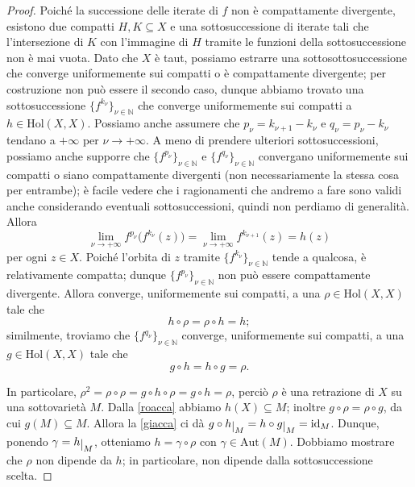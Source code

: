 \begin{proof}
    Poiché la successione delle iterate di $f$ non è compattamente divergente, esistono due compatti $H,K\subseteq X$ e una sottosuccessione di iterate tali che l'intersezione di $K$ con l'immagine di $H$ tramite le funzioni della sottosuccessione non è mai vuota. Dato che $X$ è taut, possiamo estrarre una sottosottosuccessione che converge uniformemente sui compatti o è compattamente divergente; per costruzione non può essere il secondo caso, dunque abbiamo trovato una sottosuccessione $\{f^{k_{\nu}}\}_{\nu\in\mathbb{N}}$ che converge uniformemente sui compatti a $h\in\text{Hol}(X,X)$. Possiamo anche assumere che $p_\nu=k_{\nu+1}-k_\nu$ e $q_\nu=p_\nu-k_\nu$ tendano a $+\infty$ per $\nu\longrightarrow+\infty$. A meno di prendere ulteriori sottosuccessioni, possiamo anche supporre che $\{f^{p_\nu}\}_{\nu\in\mathbb{N}}$ e $\{f^{q_\nu}\}_{\nu\in\mathbb{N}}$ convergano uniformemente sui compatti o siano compattamente divergenti (non necessariamente la stessa cosa per entrambe); è facile vedere che i ragionamenti che andremo a fare sono validi anche considerando eventuali sottosuccessioni, quindi non perdiamo di generalità. Allora
    $$\lim_{\nu\longrightarrow+\infty}f^{p_\nu}\big(f^{k_\nu}(z)\big)=\lim_{\nu\longrightarrow+\infty}f^{k_{\nu+1}}(z)=h(z)$$
    per ogni $z \in X$. Poiché l'orbita di $z$ tramite $\{f^{k_\nu}\}_{\nu\in\mathbb{N}}$ tende a qualcosa, è relativamente compatta; dunque $\{f^{p_\nu}\}_{\nu\in\mathbb{N}}$ non può essere compattamente divergente. Allora converge, uniformemente sui compatti, a una $\rho\in\text{Hol}(X,X)$ tale che
    \begin{equation} \label{roacca}
        h\circ\rho=\rho\circ h=h;
    \end{equation}
    similmente, troviamo che $\{f^{q_\nu}\}_{\nu\in\mathbb{N}}$ converge, uniformemente sui compatti, a una $g\in\text{Hol}(X,X)$ tale che
    \begin{equation} \label{giacca}
        g\circ h=h\circ g=\rho.
    \end{equation}

    In particolare, $\rho^2=\rho\circ\rho=g\circ h\circ\rho=g\circ h=\rho$, perciò $\rho$ è una retrazione di $X$ su una sottovarietà $M$. Dalla \eqref{roacca} abbiamo $h(X)\subseteq M$; inoltre $g\circ\rho=\rho\circ g$, da cui $g(M)\subseteq M$. Allora la \eqref{giacca} ci dà $g\circ h\restrict{M}=h\circ g\restrict{M}=\id_M$. Dunque, ponendo $\gamma=h\restrict{M}$, otteniamo $h=\gamma\circ\rho$ con $\gamma\in\text{Aut}(M)$. Dobbiamo mostrare che $\rho$ non dipende da $h$; in particolare, non dipende dalla sottosuccessione scelta.


\end{proof}
